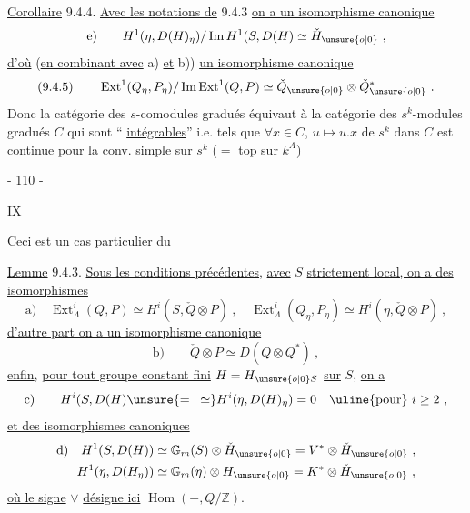 \uline{Corollaire} 9.4.4. \uline{Avec les notations de} 9.4.3 \uline{on a un isomorphisme canonique}
\[
 \text{e)}\qquad H^1(\eta,D(H)_\eta)/\operatorname{Im}H^1(S,D(H)\simeq\check H_{\unsure{o|0}}\ ,
\]
\uline{d'où} (\uline{en combinant avec} a) \uline{et} b)) \uline{un isomorphisme canonique}
\[
 (9.4.5)\qquad\operatorname{Ext}^1(Q_\eta,P_\eta)/\operatorname{Im}\operatorname{Ext}^1(Q,P)\simeq\check Q_{\unsure{o|0}}\otimes\check Q_{\unsure{o|0}}^*\ .
\]
Donc la catégorie des $s$-comodules gradués équivaut à la catégorie des $s^k$-modules gradués $C$  qui sont `` \uline{intégrables}''
i.e. tels que $\forall x\in C$, $u\longmapsto u.x$ de $s^k$ dans $C$ est continue pour la conv. simple sur $s^k$ ($=$ top  sur $k^A$)
\begin{center}- 110 -\end{center}\hfill IX

Ceci est un cas particulier du

\uline{Lemme} 9.4.3. \uline{Sous les conditions précédentes}, \uline{avec} $S$ \uline{strictement local, on a des isomorphismes}
\[
 \text{a)}\quad\operatorname{Ext}^i_\Lambda(Q,P)\simeq H^i(S,\check Q\otimes P)\ ,\quad
 \operatorname{Ext}^i_\Lambda(Q_\eta,P_\eta)\simeq H^i(\eta,\check Q\otimes P)\ ,
\]
\uline{d'autre part on a un isomorphisme canonique}
\[
 \text{b)}\qquad\check Q\otimes P\simeq D(Q\otimes Q^*)\ ,
\]
\uline{enfin}, \uline{pour tout groupe constant fini} $H=H_{\unsure{o|0}S}$ \uline{sur} $S$, \uline{on a}
\[
 \text{c)}\qquad H^i(S,D(H)\unsure{=|\simeq}H^i(\eta,D(H)_\eta)=0\quad\text{\uline{pour} }i\geq2\ ,
\]
\uline{et des isomorphismes canoniques}
\[
 \begin{aligned}
 \text{d)}\quad H^1(S,D(H))&\simeq\mathbb G_m(S)\otimes\check H_{\unsure{o|0}}=V^*\otimes\check H_{\unsure{o|0}}\ ,\\
 H^1(\eta,D(H_\eta))&\simeq\mathbb G_m(\eta)\otimes H_{\unsure{o|0}}=K^*\otimes\check H_{\unsure{o|0}}\ ,
 \end{aligned}
\]
\uline{où le signe} $\vee$ \uline{désigne ici} $\operatorname{Hom}(-,Q/\mathbb Z)$.

